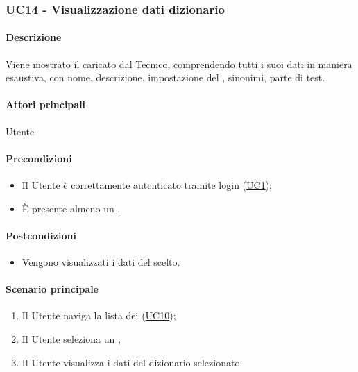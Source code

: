 \subsubsection{UC14 - Visualizzazione dati dizionario}\label{UC14}
\paragraph*{Descrizione}
Viene mostrato il  caricato dal Tecnico, comprendendo tutti i suoi dati in maniera esaustiva, con nome, descrizione, impostazione del , sinonimi, parte di test.

\paragraph*{Attori principali}
Utente

\paragraph*{Precondizioni}
\begin{itemize}
  \item Il Utente è correttamente autenticato tramite login (\hyperref[UC1]{UC1});
  \item È presente almeno un .
\end{itemize}

\paragraph*{Postcondizioni}
\begin{itemize}
  \item Vengono visualizzati i dati del  scelto.
\end{itemize}

\paragraph*{Scenario principale}
\begin{enumerate}
  \item Il Utente naviga la lista dei  (\hyperref[UC10]{UC10});
  \item Il Utente seleziona un ;
  \item Il Utente visualizza i dati del dizionario selezionato.
\end{enumerate}

